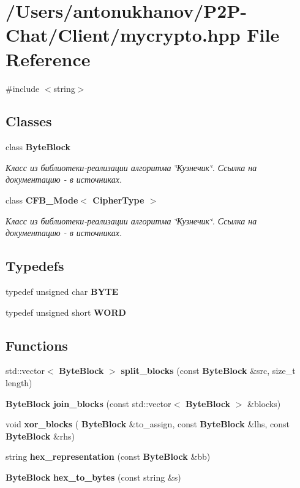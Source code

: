 \section{/\+Users/antonukhanov/\+P2\+P-\/\+Chat/\+Client/mycrypto.hpp File Reference}
\label{mycrypto_8hpp}
{\ttfamily \#include $<$string$>$}\newline
\subsection*{Classes}
\begin{DoxyCompactItemize}
\item 
class \textbf{ Byte\+Block}
\begin{DoxyCompactList}\small\item\em Класс из библиотеки-\/реализации алгоритма \char`\"{}Кузнечик\char`\"{}. Ссылка на документацию -\/ в источниках. \end{DoxyCompactList}\item 
class \textbf{ C\+F\+B\+\_\+\+Mode$<$ Cipher\+Type $>$}
\begin{DoxyCompactList}\small\item\em Класс из библиотеки-\/реализации алгоритма \char`\"{}Кузнечик\char`\"{}. Ссылка на документацию -\/ в источниках. \end{DoxyCompactList}\end{DoxyCompactItemize}
\subsection*{Typedefs}
\begin{DoxyCompactItemize}
\item 
typedef unsigned char \textbf{ B\+Y\+TE}
\item 
typedef unsigned short \textbf{ W\+O\+RD}
\end{DoxyCompactItemize}
\subsection*{Functions}
\begin{DoxyCompactItemize}
\item 
std\+::vector$<$ \textbf{ Byte\+Block} $>$ \textbf{ split\+\_\+blocks} (const \textbf{ Byte\+Block} \&src, size\+\_\+t length)
\item 
\textbf{ Byte\+Block} \textbf{ join\+\_\+blocks} (const std\+::vector$<$ \textbf{ Byte\+Block} $>$ \&blocks)
\item 
void \textbf{ xor\+\_\+blocks} (\textbf{ Byte\+Block} \&to\+\_\+assign, const \textbf{ Byte\+Block} \&lhs, const \textbf{ Byte\+Block} \&rhs)
\item 
string \textbf{ hex\+\_\+representation} (const \textbf{ Byte\+Block} \&bb)
\item 
\textbf{ Byte\+Block} \textbf{ hex\+\_\+to\+\_\+bytes} (const string \&s)
\end{DoxyCompactItemize}


